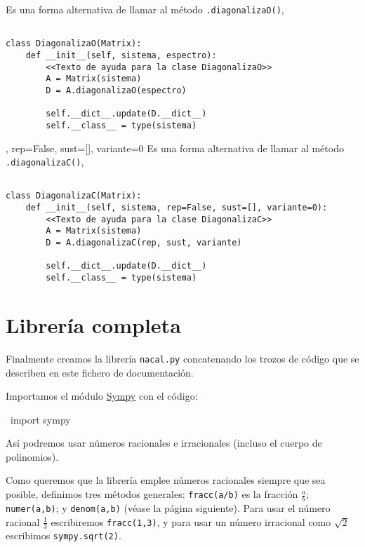 \documentclass[11pt]{report}
\begin{document}
Es una forma alternativa de llamar al método \texttt{.diagonalizaO()},
\begin{verbatim}

class DiagonalizaO(Matrix):
    def __init__(self, sistema, espectro):
        <<Texto de ayuda para la clase DiagonalizaO>>
        A = Matrix(sistema)
        D = A.diagonalizaO(espectro)
            
        self.__dict__.update(D.__dict__)
        self.__class__ = type(sistema)

\end{verbatim}


, rep=False, sust=[], variante=0
Es una forma alternativa de llamar al método \texttt{.diagonalizaC()},
\begin{verbatim}

class DiagonalizaC(Matrix):
    def __init__(self, sistema, rep=False, sust=[], variante=0):
        <<Texto de ayuda para la clase DiagonalizaC>>
        A = Matrix(sistema)
        D = A.diagonalizaC(rep, sust, variante)
            
        self.__dict__.update(D.__dict__)
        self.__class__ = type(sistema)

\end{verbatim}


\part{Librería completa}
\label{sec:org6b82dec}

Finalmente creamos la librería \texttt{nacal.py} concatenando los trozos de
código que se describen en este fichero de documentación.

Importamos el módulo \href{https://www.sympy.org/en/index.html}{Sympy} con el código:
\begin{center}
~import sympy~
\end{center}
Así podremos usar números racionales e irracionales (incluso el cuerpo
de polinomios). 

Como queremos que la librería emplee números racionales siempre que
sea posible, definimos tres métodos generales: \texttt{fracc(a/b)} es la
fracción \(\frac{a}{b}\); \texttt{numer(a,b)}; y \texttt{denom(a,b)} (véase la página
siguiente). Para usar el número racional \(\frac{1}{3}\) escribiremos
\texttt{fracc(1,3)}, y para usar un número irracional como \(\sqrt{2}\)
escribimos \texttt{sympy.sqrt(2)}. 
\end{document}

